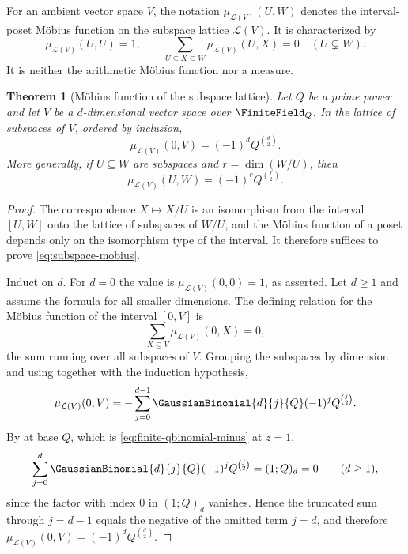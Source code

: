 \documentclass[11pt,a4paper,oneside,openany]{book}
\newtheorem{theorem}{Theorem}[chapter]
\theoremstyle{definition}
\theoremstyle{remark}
\newcommand{\SubspaceMobius}[3]{\mu_{\mathcal L(#1)}\!\left(#2,#3\right)}
\begin{document}
For an ambient vector space $V$, the notation
$\SubspaceMobius{V}{U}{W}$ denotes the interval-poset M\"obius function on
the subspace lattice $\mathcal L(V)$.  It is characterized by
\[
 \SubspaceMobius{V}{U}{U}=1,
 \qquad
 \sum_{U\subseteq X\subseteq W}\SubspaceMobius{V}{U}{X}=0
 \quad(U\subsetneq W).
\]
It is neither the arithmetic M\"obius function nor a measure.

\begin{theorem}[M\"obius function of the subspace lattice]\label{thm:subspace-mobius}
Let $Q$ be a prime power and let $V$ be a $d$-dimensional vector space over $\FiniteField_{Q}$.  In the lattice of subspaces of $V$, ordered by inclusion,
\begin{equation}\label{eq:subspace-mobius}
 \SubspaceMobius{V}{0}{V}=(-1)^dQ^{\binom d2}.
\end{equation}
More generally, if $U\subseteq W$ are subspaces and $r=\dim(W/U)$, then
\[
 \SubspaceMobius{V}{U}{W}=(-1)^rQ^{\binom r2}.
\]
\end{theorem}

\begin{proof}
The correspondence $X\mapsto X/U$ is an isomorphism from the interval $[U,W]$ onto the lattice of subspaces of $W/U$, and the M\"obius function of a poset depends only on the isomorphism type of the interval.  It therefore suffices to prove \eqref{eq:subspace-mobius}.

Induct on $d$.  For $d=0$ the value is
$\SubspaceMobius{V}{0}{0}=1$, as asserted.  Let $d\ge1$ and assume the
formula for all smaller dimensions.  The defining relation for the M\"obius
function of the interval $[0,V]$ is
\[
 \sum_{X\subseteq V}\SubspaceMobius{V}{0}{X}=0,
\]
the sum running over all subspaces of $V$.  Grouping the subspaces by dimension and using  together with the induction hypothesis,
\[
 \SubspaceMobius{V}{0}{V}
 =-\sum_{j=0}^{d-1}\GaussianBinomial{d}{j}{Q}(-1)^jQ^{\binom j2}.
\]
By  at base $Q$, which is \eqref{eq:finite-qbinomial-minus} at $z=1$,
\[
 \sum_{j=0}^{d}\GaussianBinomial{d}{j}{Q}(-1)^jQ^{\binom j2}=(1;Q)_d=0
 \qquad(d\ge1),
\]
since the factor with index $0$ in $(1;Q)_d$ vanishes.  Hence the truncated sum through $j=d-1$ equals the negative of the omitted term $j=d$, and therefore
$\SubspaceMobius{V}{0}{V}=(-1)^dQ^{\binom d2}$.
\end{proof}
\end{document}
